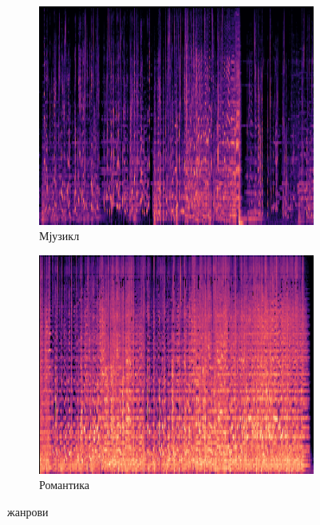 \documentclass{article}
\begin{document}
\begin{figure}[htbp]
  \centering
  \begin{subfigure}{0.45\textwidth}
    \centering
    \includegraphics[width=\linewidth]{slike/musical23.png} %
    \caption{Мјузикл}
    \label{fig:slika7}
  \end{subfigure}
  \hfill
  \begin{subfigure}{0.45\textwidth}
    \centering
    \includegraphics[width=\linewidth]{slike/romantic00.png} %
    \caption{Романтика}
    \label{fig:slika8}
  \end{subfigure}
  \caption{жанрови}
  \label{fig:zajednicki_naslov3}
\end{figure}
\end{document}
